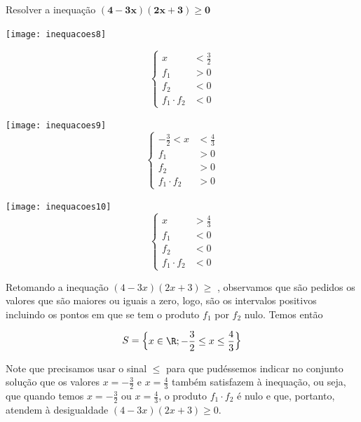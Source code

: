 \begin{example}{Resolver a inequação $\bm{(4-3x)(2x+3)\geq0}$}
\begin{multicols}{3}
\texttt{[image: inequacoes8]}

\begin{equation*}
\left \{
\begin{aligned}
x&<\frac{3}{2}\\
f_1&>0\\
f_2&<0\\
f_1\cdot f_2&<0
\end{aligned}
\right.
\end{equation*}


\texttt{[image: inequacoes9]}
\begin{equation*}
\left \{
\begin{aligned}
-\frac{3}{2}<x&<\frac{4}{3}\\
f_1&>0\\
f_2&>0\\
f_1\cdot f_2&>0
\end{aligned}
\right.
\end{equation*}


\texttt{[image: inequacoes10]}
\begin{equation*}
\left \{
\begin{aligned}
x&>\frac{4}{3}\\
f_1&<0\\
f_2&<0\\
f_1\cdot f_2&<0
\end{aligned}
\right.
\end{equation*}
\end{multicols}
Retomando a inequação $(4-3x)(2x+3)\geq$ , observamos que são pedidos os valores que são maiores ou iguais a zero, logo, são os intervalos positivos incluindo os pontos em que se tem o produto $f_1$ por $f_2$ nulo. Temos então 

\begin{equation*}
S=\left \{
\begin{aligned}
x\in\R;-\frac{3}{2}\leq x\leq\frac{4}{3}
\end{aligned}
\right\}
\end{equation*}
\end{example}

\begin{observation}{}
Note que precisamos usar o sinal $\leq$ para que pudéssemos indicar no conjunto solução que os valores $x=-\frac{3}{2}$ e $x=\frac{4}{3}$ também satisfazem à inequação, ou seja, que quando temos $x=-\frac{3}{2}$ ou $x=\frac{4}{3}$, o produto $f_1\cdot f_2$ é nulo e que, portanto, atendem à desigualdade $(4-3x)(2x+3)\geq0$.
\end{observation}

